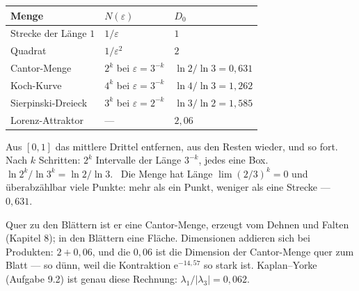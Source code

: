 \begin{merksatz}
\begin{center}
{\small
\renewcommand{\arraystretch}{1.5}
\begin{tabular}{@{}P{2.6cm}P{3.6cm}P{2.4cm}@{}}
\toprule
\textbf{Menge} & $N(\varepsilon)$ & $D_0$\\
\midrule
Strecke der Länge $1$ & $1/\varepsilon$ & $1$\\
Quadrat & $1/\varepsilon^{2}$ & $2$\\
Cantor-Menge & $2^{k}$ bei $\varepsilon = 3^{-k}$ & $\ln2/\ln3 = 0{,}631$\\
Koch-Kurve & $4^{k}$ bei $\varepsilon = 3^{-k}$ & $\ln4/\ln3 = 1{,}262$\\
Sierpinski-Dreieck & $3^{k}$ bei $\varepsilon = 2^{-k}$ & $\ln3/\ln2 = 1{,}585$\\
Lorenz-Attraktor & --- & $2{,}06$\\
\bottomrule
\end{tabular}}
\end{center}

Aus $[0,1]$ das mittlere Drittel entfernen, aus den Resten wieder, und so fort. Nach $k$ Schritten: $2^{k}$ Intervalle der Länge $3^{-k}$, jedes eine Box. $\ln2^{k}/\ln3^{k} = \ln2/\ln3$. \checkmark\ Die Menge hat Länge $\lim(2/3)^{k} = 0$ und überabzählbar viele Punkte: mehr als ein Punkt, weniger als eine Strecke --- $0{,}631$.

Quer zu den Blättern ist er eine Cantor-Menge, erzeugt vom Dehnen und Falten (Kapitel 8); in den Blättern eine Fläche. Dimensionen addieren sich bei Produkten: $2 + 0{,}06$, und die $0{,}06$ ist die Dimension der Cantor-Menge quer zum Blatt --- so dünn, weil die Kontraktion $\mathrm e^{-14{,}57}$ so stark ist. Kaplan--Yorke (Aufgabe 9.2) ist genau diese Rechnung: $\lambda_1/|\lambda_3| = 0{,}062$.

\begin{center}
\begin{minipage}{0.88\textwidth}
\end{minipage}
\end{center}
\end{merksatz}

